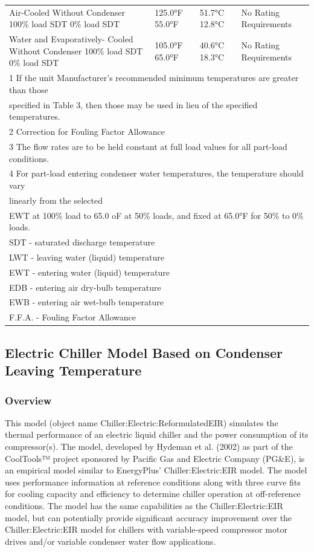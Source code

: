 \begin{longtable}[c]{p{1.2in}p{1.2in}p{1.2in}p{1.2in}p{1.2in}}
Air-Cooled Without  Condenser  100\% load SDT  0\% load SDT & 125.0°F  55.0°F & 51.7°C  12.8°C & \multicolumn{2}{l}{No Rating Requirements} \tabularnewline
Water and Evaporatively-  Cooled Without  Condenser  100\% load SDT  0\% load SDT & 105.0°F  65.0°F & 40.6°C  18.3°C & \multicolumn{2}{l}{No Rating Requirements} \tabularnewline
\multicolumn{5}{l}{1 If the unit Manufacturer’s recommended minimum temperatures are greater than those} \tabularnewline
\multicolumn{5}{l}{specified in  Table 3, then those may be used in lieu of the specified temperatures.} \tabularnewline
\multicolumn{5}{l}{2 Correction for Fouling Factor Allowance} \tabularnewline
\multicolumn{5}{l}{3 The flow rates are to be held constant at full load values for all part-load conditions.} \tabularnewline
\multicolumn{5}{l}{4 For part-load entering condenser water temperatures, the temperature should vary} \tabularnewline
\multicolumn{5}{l}{linearly from  the selected} \tabularnewline
\multicolumn{5}{l}{EWT at 100\% load to 65.0 oF at 50\% loads, and fixed at 65.0°F for 50\% to 0\% loads.} \tabularnewline
\multicolumn{5}{l}{SDT - saturated discharge temperature} \tabularnewline
\multicolumn{5}{l}{LWT - leaving water (liquid) temperature} \tabularnewline
\multicolumn{5}{l}{EWT - entering water (liquid) temperature} \tabularnewline
\multicolumn{5}{l}{EDB - entering air dry-bulb temperature} \tabularnewline
\multicolumn{5}{l}{EWB - entering air wet-bulb temperature} \tabularnewline
\multicolumn{5}{l}{F.F.A. - Fouling Factor Allowance} \tabularnewline
\bottomrule
\end{longtable}

\subsection{Electric Chiller Model Based on Condenser Leaving Temperature}\label{electric-chiller-model-based-on-condenser-leaving-temperature}

\subsubsection{Overview}\label{overview-3-002}

This model (object name Chiller:Electric:ReformulatedEIR) simulates the thermal performance of an electric liquid chiller and the power consumption of its compressor(s). The model, developed by Hydeman et al. (2002) as part of the CoolTools™ project sponsored by Pacific Gas and Electric Company (PG\&E), is an empirical model similar to EnergyPlus' Chiller:Electric:EIR model. The model uses performance information at reference conditions along with three curve fits for cooling capacity and efficiency to determine chiller operation at off-reference conditions. The model has the same capabilities as the Chiller:Electric:EIR model, but can potentially provide significant accuracy improvement over the Chiller:Electric:EIR model for chillers with variable-speed compressor motor drives and/or variable condenser water flow applications.

